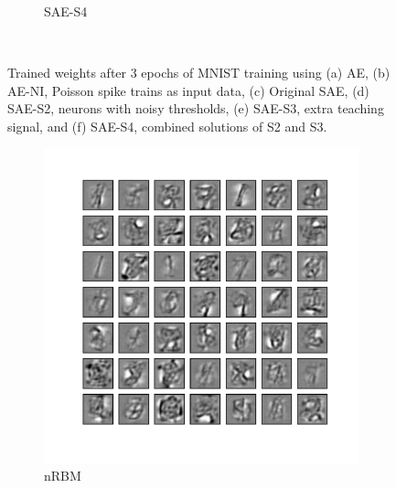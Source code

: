 \begin{figure}
\begin{subfigure}[t]{0.4\textwidth}
		\caption{SAE-S4}
	\end{subfigure}\\
	\DIFdelbeginFL %
\DIFdelendFL \DIFaddbeginFL \caption[Comparisons of trained weights using (spiking) AEs.]{\DIFaddendFL Trained weights after 3 epochs of MNIST training using (a) AE, (b) AE-NI, Poisson spike trains as input data, (c) Original SAE, (d) SAE-S2, neurons with noisy thresholds, (e) SAE-S3, extra teaching signal, and (f) SAE-S4, combined solutions of S2 and S3.}
	\label{fig:weights_ae}
\end{figure}

\begin{figure}
	\centering
	\begin{subfigure}[t]{0.4\textwidth}
		\includegraphics[width=\textwidth]{pics_sdlm/32_MNIST_RBM/2_60000_0.pdf}
		\caption{nRBM}
	\end{subfigure}
	\begin{subfigure}[t]{0.4\textwidth}

\end{subfigure}
\end{figure}
